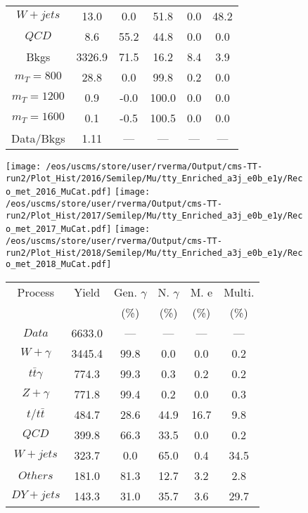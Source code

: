 \begin{figure}
\begin{minipage}[c]{0.32\textwidth}
{\begin{tabular}{cccccc}
$ W+jets $ &  13.0 &  0.0 &  51.8 &  0.0 &  48.2\\
$ QCD $ &  8.6 &  55.2 &  44.8 &  0.0 &  0.0\\
Bkgs &  3326.9 &  71.5 &  16.2 &  8.4 &  3.9\\
$ m_{T} = 800 $ &  28.8 &  0.0 &  99.8 &  0.2 &  0.0\\
$ m_{T} = 1200 $ &  0.9 &  -0.0 &  100.0 &  0.0 &  0.0\\
$ m_{T} = 1600 $ &  0.1 &  -0.5 &  100.5 &  0.0 &  0.0\\
Data/Bkgs &  1.11 &  --- &  --- &  --- &  ---\\
\hline
\end{tabular}
}
\end{minipage}
\end{figure}

\begin{figure}
\centering
\texttt{[image: /eos/uscms/store/user/rverma/Output/cms-TT-run2/Plot\_Hist/2016/Semilep/Mu/tty\_Enriched\_a3j\_e0b\_e1y/Reco\_met\_2016\_MuCat.pdf]}
\texttt{[image: /eos/uscms/store/user/rverma/Output/cms-TT-run2/Plot\_Hist/2017/Semilep/Mu/tty\_Enriched\_a3j\_e0b\_e1y/Reco\_met\_2017\_MuCat.pdf]}
\texttt{[image: /eos/uscms/store/user/rverma/Output/cms-TT-run2/Plot\_Hist/2018/Semilep/Mu/tty\_Enriched\_a3j\_e0b\_e1y/Reco\_met\_2018\_MuCat.pdf]}
\begin{minipage}[c]{0.32\textwidth}
\centering
\tiny{
\begin{tabular}{cccccc}
\hline
Process & Yield & Gen. $\gamma$ & N. $\gamma$ & M. e & Multi. \\
 &  & (\%) & (\%) & (\%) & (\%)  \\
\hline
                                                                      $ Data $ &  6633.0 &  --- &  --- &  --- &  ---\\
$ W+\gamma $ &  3445.4 &  99.8 &  0.0 &  0.0 &  0.2\\
$ t\bar{t}\gamma $ &  774.3 &  99.3 &  0.3 &  0.2 &  0.2\\
$ Z+\gamma $ &  771.8 &  99.4 &  0.2 &  0.0 &  0.3\\
$ t/t\bar{t} $ &  484.7 &  28.6 &  44.9 &  16.7 &  9.8\\
$ QCD $ &  399.8 &  66.3 &  33.5 &  0.0 &  0.2\\
$ W+jets $ &  323.7 &  0.0 &  65.0 &  0.4 &  34.5\\
$ Others $ &  181.0 &  81.3 &  12.7 &  3.2 &  2.8\\
$ DY+jets $ &  143.3 &  31.0 &  35.7 &  3.6 &  29.7\\

\end{tabular}}
\end{minipage}
\end{figure}

